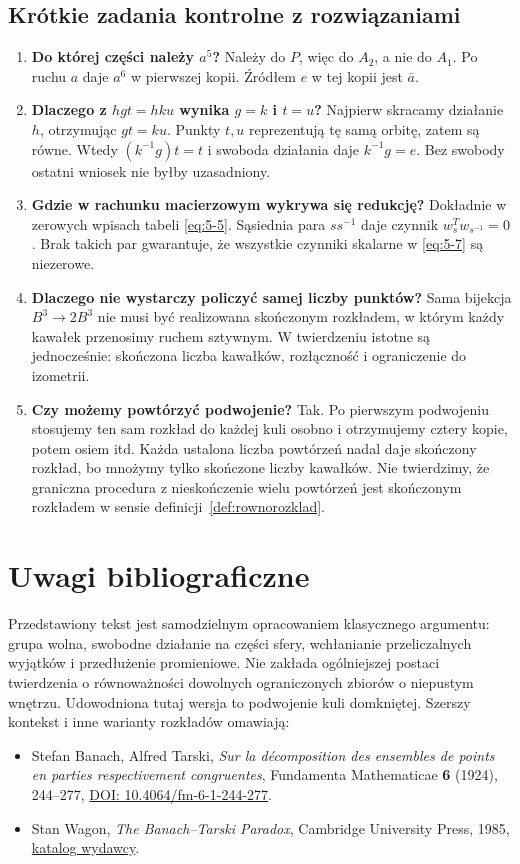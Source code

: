 \documentclass[11pt,a4paper]{article}
\numberwithin{equation}{section}
\theoremstyle{plain}
\theoremstyle{definition}
\theoremstyle{remark}
\begin{document}
\subsection{Krótkie zadania kontrolne z rozwiązaniami}
\begin{enumerate}
\item \textbf{Do której części należy $a^5$?} Należy do $P$, więc do $A_2$, a nie do $A_1$. Po ruchu $a$ daje $a^6$ w pierwszej kopii. Źródłem $e$ w tej kopii jest $\bar a$.
\item \textbf{Dlaczego z $hgt=hku$ wynika $g=k$ i $t=u$?} Najpierw skracamy działanie $h$, otrzymując $gt=ku$. Punkty $t,u$ reprezentują tę samą orbitę, zatem są równe. Wtedy $(k^{-1}g)t=t$ i swoboda działania daje $k^{-1}g=e$. Bez swobody ostatni wniosek nie byłby uzasadniony.
\item \textbf{Gdzie w rachunku macierzowym wykrywa się redukcję?} Dokładnie w zerowych wpisach tabeli \eqref{eq:5-5}. Sąsiednia para $ss^{-1}$ daje czynnik $w_s^Tw_{s^{-1}}=0$. Brak takich par gwarantuje, że wszystkie czynniki skalarne w \eqref{eq:5-7} są niezerowe.
\item \textbf{Dlaczego nie wystarczy policzyć samej liczby punktów?} Sama bijekcja $B^3\to2B^3$ nie musi być realizowana skończonym rozkładem, w którym każdy kawałek przenosimy ruchem sztywnym. W twierdzeniu istotne są jednocześnie: skończona liczba kawałków, rozłączność i ograniczenie do izometrii.
\item \textbf{Czy możemy powtórzyć podwojenie?} Tak. Po pierwszym podwojeniu stosujemy ten sam rozkład do każdej kuli osobno i otrzymujemy cztery kopie, potem osiem itd. Każda ustalona liczba powtórzeń nadal daje skończony rozkład, bo mnożymy tylko skończone liczby kawałków. Nie twierdzimy, że graniczna procedura z nieskończenie wielu powtórzeń jest skończonym rozkładem w sensie definicji~\ref{def:rownorozklad}.
\end{enumerate}

\section*{Uwagi bibliograficzne}
Przedstawiony tekst jest samodzielnym opracowaniem klasycznego argumentu: grupa wolna, swobodne działanie na części sfery, wchłanianie przeliczalnych wyjątków i przedłużenie promieniowe. Nie zakłada ogólniejszej postaci twierdzenia o równoważności dowolnych ograniczonych zbiorów o niepustym wnętrzu. Udowodniona tutaj wersja to podwojenie kuli domkniętej. Szerszy kontekst i inne warianty rozkładów omawiają:
\begin{itemize}
\item Stefan Banach, Alfred Tarski, \emph{Sur la décomposition des ensembles de points en parties respectivement congruentes}, Fundamenta Mathematicae \textbf{6} (1924), 244--277, \href{https://doi.org/10.4064/fm-6-1-244-277}{DOI: 10.4064/fm-6-1-244-277}.
\item Stan Wagon, \emph{The Banach--Tarski Paradox}, Cambridge University Press, 1985, \href{https://www.cambridge.org/core/books/the-banach-tarski-paradox/EA35091E69D798AE0FAE5A4E8386DD08}{katalog wydawcy}.
\end{itemize}
\end{document}
